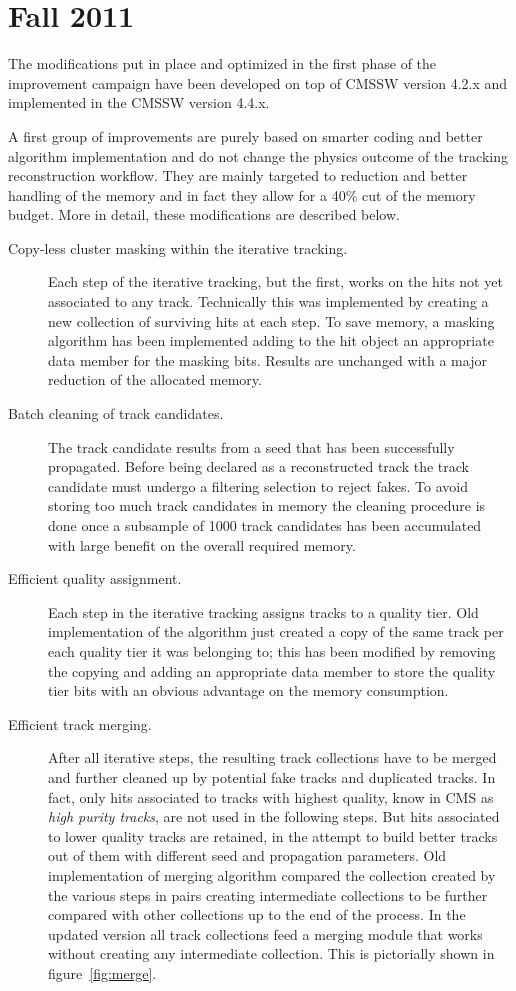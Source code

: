 \section{Fall 2011}
\label{fall11}

The modifications put in place and optimized in the first phase of the
improvement campaign have been developed on top of CMSSW version 4.2.x
and implemented in the CMSSW version 4.4.x. 

A first group of improvements are purely based on smarter coding
and better algorithm implementation and do not
change the physics outcome of the tracking reconstruction
workflow. They are mainly targeted to reduction and better handling of
the memory and in fact they allow for a 40\% cut of the
memory budget. More in detail, these modifications are described below.
\begin{description}
\item[Copy-less cluster masking within the iterative tracking.] Each
  step of the iterative tracking, but the first, works on the hits not
  yet associated to any track. Technically this was implemented by
  creating a new collection of surviving hits at each step. To save
  memory, a masking algorithm has been implemented adding to the hit
  object an appropriate data member for the masking bits. Results are
  unchanged with a major reduction of the allocated memory.
\item[Batch cleaning of track candidates.] The track candidate results
  from a seed that has been successfully propagated. Before being
  declared as a reconstructed track the track candidate must undergo
  a filtering selection to reject fakes. To
  avoid storing too much track candidates in memory the
  cleaning procedure is done once a subsample of 1000 track candidates
  has been accumulated with large benefit on the overall required memory.
\item[Efficient quality assignment.] Each step in
  the iterative tracking assigns tracks to a quality tier. Old
  implementation of the algorithm just created a copy of the same
  track per each quality tier it was belonging to; this has been
  modified by removing the copying and adding an appropriate data
  member to store the quality tier bits with an obvious advantage on
  the memory consumption.
\item[Efficient track merging.] After all iterative steps, the
  resulting track collections have to be merged and further cleaned up
  by potential fake tracks and duplicated tracks. In fact, only hits
  associated to tracks with highest quality, know in CMS as {\em high 
    purity tracks}, are not used in the following steps. But hits
  associated to lower quality tracks are retained, in the attempt to
  build better tracks out of them with different seed and propagation
  parameters. Old implementation of merging algorithm compared the
  collection created by the various steps in pairs creating intermediate
  collections to be further compared with other collections up to the
  end of the process. In the updated version all track collections
  feed a merging module that works without creating any intermediate
  collection. This is pictorially shown in figure~\ref{fig:merge}.
\end{description}
